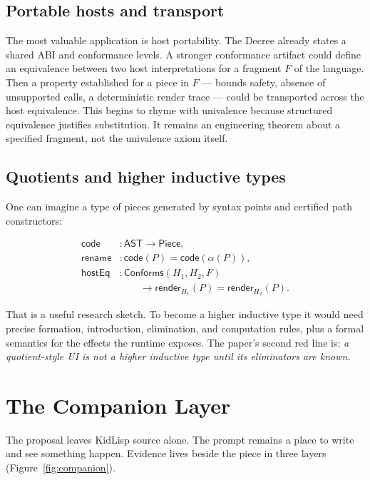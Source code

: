 \documentclass[10pt,letterpaper,twocolumn]{article}
\newcommand{\code}[1]{\texttt{\detokenize{#1}}}
\begin{document}
\subsection{Portable hosts and transport}

The most valuable application is host portability. The Decree already states a shared ABI and conformance levels. A stronger conformance artifact could define an equivalence between two host interpretations for a fragment $F$ of the language. Then a property established for a piece in $F$ --- bounds safety, absence of unsupported calls, a deterministic render trace --- could be transported across the host equivalence. This begins to rhyme with univalence because structured equivalence justifies substitution. It remains an engineering theorem about a specified fragment, not the univalence axiom itself.

\subsection{Quotients and higher inductive types}

One can imagine a type of pieces generated by syntax points and certified path constructors:

\[
\begin{array}{ll}
\mathsf{code} &: \mathsf{AST}\to\mathsf{Piece},\\
\mathsf{rename} &: \mathsf{code}(P)=\mathsf{code}(\alpha(P)),\\
\mathsf{hostEq} &: \mathsf{Conforms}(H_1,H_2,F)\\
 &\qquad\to \mathsf{render}_{H_1}(P)=\mathsf{render}_{H_2}(P).
\end{array}
\]

That is a useful research sketch. To become a higher inductive type it would need precise formation, introduction, elimination, and computation rules, plus a formal semantics for the effects the runtime exposes. The paper's second red line is: \emph{a quotient-style UI is not a higher inductive type until its eliminators are known.}

\section{The Companion Layer}
\label{sec:design}

The proposal leaves KidLisp source alone. The prompt remains a place to write \code{(circle ? ? ?)} and see something happen. Evidence lives beside the piece in three layers (Figure~\ref{fig:companion}).
\end{document}
